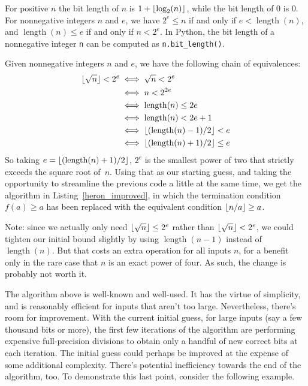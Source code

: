 \documentclass[a4paper]{article}
\DeclarePairedDelimiter\floor{\lfloor}{\rfloor}
\DeclareMathOperator{\length}{length}
\theoremstyle{plain}
\theoremstyle{definition}
\begin{document}
For positive $n$ the bit length of $n$ is $1 + \floor{\log_2(n)}$, while the
bit length of $0$ is $0$. For nonnegative integers $n$ and $e$, we have $2^e
\le n$ if and only if $e < \length(n)$, and $\length(n) \le e$ if and only if $n
< 2^e$. In Python, the bit length of a nonnegative integer \lstinline$n$ can be
computed as \lstinline$n.bit_length()$.

Given nonnegative integers $n$ and $e$, we have the following chain
of equivalences:
\begin{align*}
  \floor{\sqrt n} < 2^e
    &\iff \sqrt n < 2^e \\
    &\iff n < 2^{2e} \\
    &\iff \length(n) \le 2e \\
    &\iff \length(n) < 2e + 1 \\
    &\iff \floor{(\length(n) - 1) / 2} < e \\
    &\iff \floor{(\length(n) + 1) / 2} \le e
\end{align*}
So taking $e = \floor{(\length(n) + 1) / 2}$, $2^e$ is the smallest power of
two that strictly exceeds the square root of~$n$. Using that as our starting
guess, and taking the opportunity to streamline the previous code a little at
the same time, we get the algorithm in Listing~\ref{heron_improved}, in which
the termination condition $f(a) \ge a$ has been replaced with the equivalent
condition $\floor{n/a} \ge a$.



Note: since we actually only need $\floor{\sqrt n} \le 2^e$ rather than
$\floor{\sqrt n} < 2^e$, we could tighten our initial bound slightly by using
$\length(n-1)$ instead of $\length(n)$. But that costs an extra operation for
all inputs $n$, for a benefit only in the rare case that $n$ is an exact power
of four. As such, the change is probably not worth it.

The algorithm above is well-known and well-used. It has the virtue of
simplicity, and is reasonably efficient for inputs that aren't too large.
Nevertheless, there's room for improvement. With the current initial guess, for
large inputs (say a few thousand bits or more), the first few iterations of the
algorithm are performing expensive full-precision divisions to obtain only a
handful of new correct bits at each iteration. The initial guess could perhaps
be improved at the expense of some additional complexity. There's potential
inefficiency towards the end of the algorithm, too. To demonstrate this last
point, consider the following example.
\end{document}
